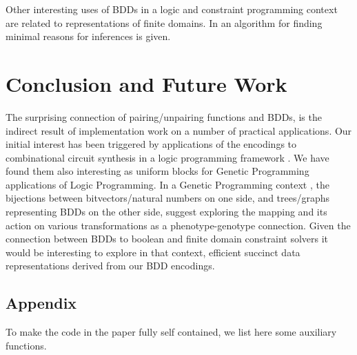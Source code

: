 \documentclass[]{INCLUDES/llncs}
\begin{document}
Other interesting uses of BDDs in a 
logic and constraint programming context are 
related to representations of
finite domains. In \cite{DBLP:conf/padl/HawkinsS06} an algorithm for
finding minimal reasons for inferences is given.

\section{Conclusion and Future Work} \label{concl}
The surprising connection of pairing/unpairing functions and BDDs, 
is the indirect result of implementation
work on a number of practical applications.
Our initial interest has been triggered by applications of the 
encodings to combinational circuit synthesis in a logic 
programming framework \cite{cf08,iclp07}.
We have found them also interesting as uniform 
blocks for Genetic Programming applications of Logic Programming.
In a Genetic Programming context \cite{koza92}, 
the bijections between bitvectors/natural numbers 
on one side, and trees/graphs representing BDDs on the other side, 
suggest exploring the mapping and its action on various
transformations as a phenotype-genotype connection. 
Given the connection between BDDs to
boolean and finite domain constraint solvers
it would be interesting to explore in that context,
efficient succinct data representations
derived from our BDD encodings.

%



\newpage
\subsection*{Appendix}
To make the code in the paper fully self contained, 
we list here some auxiliary functions.
\end{document}
